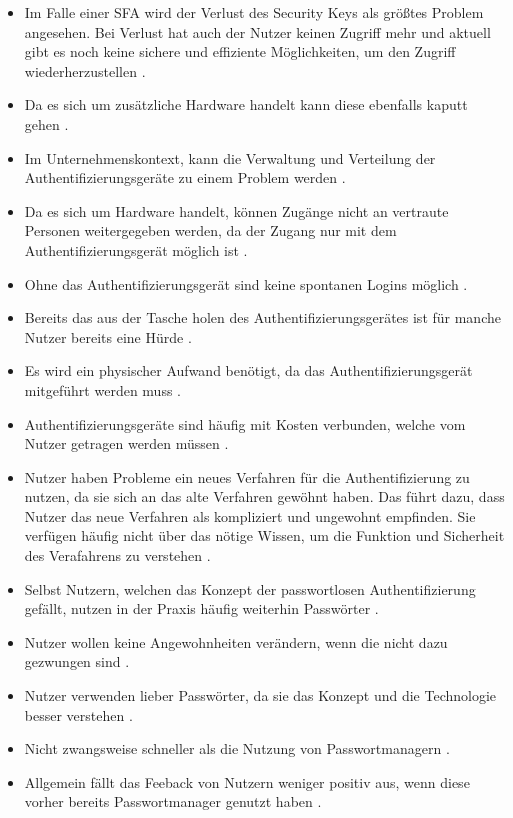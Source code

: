 \begin{itemize}
    \item Im Falle einer \ac{SFA} wird der Verlust des Security Keys als größtes Problem angesehen. Bei Verlust hat auch der Nutzer keinen Zugriff mehr und aktuell gibt es noch keine sichere und effiziente Möglichkeiten, um den Zugriff wiederherzustellen \cite{lyastani2020fido2}.
    \item Da es sich um zusätzliche Hardware handelt kann diese ebenfalls kaputt gehen \cite{farke2020you}.
    \item Im Unternehmenskontext, kann die Verwaltung und Verteilung der Authentifizierungsgeräte zu einem Problem werden \cite{farke2020you}. 
    \item Da es sich um Hardware handelt, können Zugänge nicht an vertraute Personen weitergegeben werden, da der Zugang nur mit dem Authentifizierungsgerät möglich ist \cite{lyastani2020fido2}.
    \item Ohne das Authentifizierungsgerät sind keine spontanen Logins möglich \cite{lyastani2020fido2}.
    \item Bereits das aus der Tasche holen des Authentifizierungsgerätes ist für manche Nutzer bereits eine Hürde \cite{farke2020you}.
    \item Es wird ein physischer Aufwand benötigt, da das Authentifizierungsgerät mitgeführt werden muss \cite{lyastani2020fido2}.
    \item Authentifizierungsgeräte sind häufig mit Kosten verbunden, welche vom Nutzer getragen werden müssen \cite{lyastani2020fido2}.
    \item Nutzer haben Probleme ein neues Verfahren für die Authentifizierung zu nutzen, da sie sich an das alte Verfahren gewöhnt haben. Das führt dazu, dass Nutzer das neue Verfahren als kompliziert und ungewohnt empfinden. Sie verfügen häufig nicht über das nötige Wissen, um die Funktion und Sicherheit des Verafahrens zu verstehen \cite{lyastani2020fido2}.
    \item Selbst Nutzern, welchen das Konzept der passwortlosen Authentifizierung gefällt, nutzen in der Praxis häufig weiterhin Passwörter \cite{farke2020you}.
    \item Nutzer wollen keine Angewohnheiten verändern, wenn die nicht dazu gezwungen sind \cite{farke2020you}.
    \item Nutzer verwenden lieber Passwörter, da sie das Konzept und die Technologie besser verstehen \cite{lyastani2020fido2}.
    \item Nicht zwangsweise schneller als die Nutzung von Passwortmanagern \cite{farke2020you}.
    \item Allgemein fällt das Feeback von Nutzern weniger positiv aus, wenn diese vorher bereits Passwortmanager genutzt haben \cite{farke2020you}.
\end{itemize}

